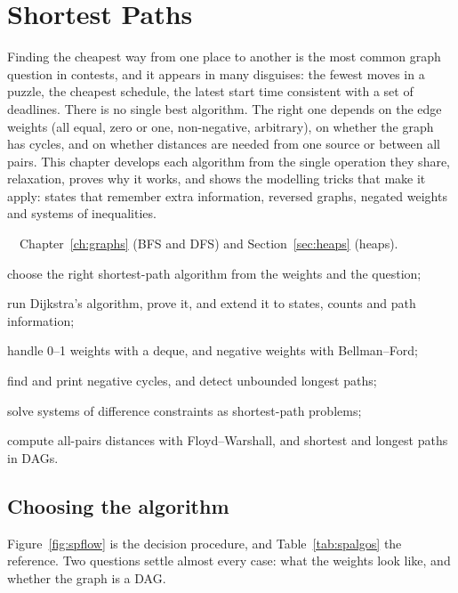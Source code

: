 \chapter{Shortest Paths}\label{ch:shortest}

Finding the cheapest way from one place to another is the most common graph question in contests, and it appears in many
disguises: the fewest moves in a puzzle, the cheapest schedule, the latest start time consistent with a set of deadlines.
There is no single best algorithm. The right one depends on the edge weights (all equal, zero or one, non-negative,
arbitrary), on whether the graph has cycles, and on whether distances are needed from one source or between all pairs. This
chapter develops each algorithm from the single operation they share, relaxation, proves why it works, and shows the
modelling tricks that make it apply: states that remember extra information, reversed graphs, negated weights and systems
of inequalities.

\begin{chapterintro}{\silver\ \gold\ \plat}{Chapter~\ref{ch:graphs} (BFS and DFS) and Section~\ref{sec:heaps} (heaps).}
  \item choose the right shortest-path algorithm from the weights and the question;
  \item run Dijkstra's algorithm, prove it, and extend it to states, counts and path information;
  \item handle 0--1 weights with a deque, and negative weights with Bellman--Ford;
  \item find and print negative cycles, and detect unbounded longest paths;
  \item solve systems of difference constraints as shortest-path problems;
  \item compute all-pairs distances with Floyd--Warshall, and shortest and longest paths in DAGs.
\end{chapterintro}

\section[Choosing the algorithm]{Choosing the algorithm \hfill \silver}\label{sec:sp-choose}

Figure~\ref{fig:spflow} is the decision procedure, and Table~\ref{tab:spalgos} the reference. Two questions settle almost
every case: what the weights look like, and whether the graph is a DAG.


